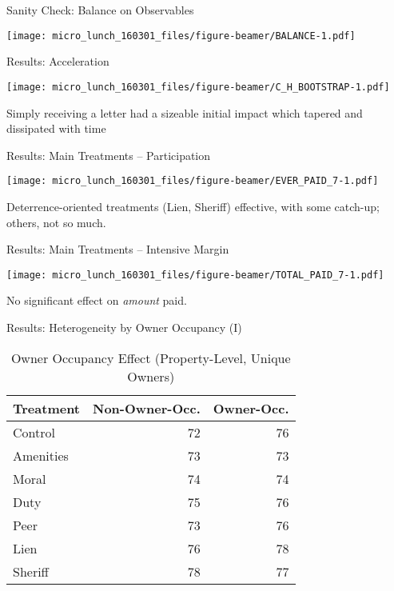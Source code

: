 \documentclass[ignorenonframetext,]{beamer}
\begin{document}
\begin{frame}{Sanity Check: Balance on Observables}

\texttt{[image: micro\_lunch\_160301\_files/figure-beamer/BALANCE-1.pdf]}

\end{frame}

\begin{frame}{Results: Acceleration}

\texttt{[image: micro\_lunch\_160301\_files/figure-beamer/C\_H\_BOOTSTRAP-1.pdf]}

Simply receiving a letter had a sizeable initial impact which tapered
and dissipated with time

\end{frame}

\begin{frame}{Results: Main Treatments -- Participation}

\texttt{[image: micro\_lunch\_160301\_files/figure-beamer/EVER\_PAID\_7-1.pdf]}

Deterrence-oriented treatments (Lien, Sheriff) effective, with some
catch-up; others, not so much.

\end{frame}

\begin{frame}{Results: Main Treatments -- Intensive Margin}

\texttt{[image: micro\_lunch\_160301\_files/figure-beamer/TOTAL\_PAID\_7-1.pdf]}

No significant effect on \emph{amount} paid.

\end{frame}

\begin{frame}{Results: Heterogeneity by Owner Occupancy (I)}

\begin{table}[ht]
\centering
\begin{tabular}{lrr}
  \hline
Treatment & Non-Owner-Occ. & Owner-Occ. \\ 
  \hline
Control & 72 & 76 \\ 
  Amenities & 73 & 73 \\ 
  Moral & 74 & 74 \\ 
  Duty & 75 & 76 \\ 
  Peer & 73 & 76 \\ 
  Lien & 76 & 78 \\ 
  Sheriff & 78 & 77 \\ 
   \hline
\end{tabular}
\caption{Owner Occupancy Effect (Property-Level, Unique Owners)} 
\label{table:delta_by_owner_occ_unq}
\end{table}

\end{frame}
\end{document}
